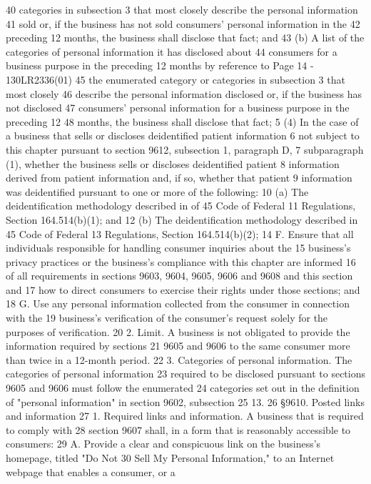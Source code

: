 40 categories in subsection 3 that most closely describe the personal information
41 sold or, if the business has not sold consumers' personal information in the
42 preceding 12 months, the business shall disclose that fact; and
43 (b) A list of the categories of personal information it has disclosed about
44 consumers for a business purpose in the preceding 12 months by reference to 
Page 14 - 130LR2336(01)
45 the enumerated category or categories in subsection 3 that most closely
46 describe the personal information disclosed or, if the business has not disclosed
47 consumers' personal information for a business purpose in the preceding 12
48 months, the business shall disclose that fact;
5 (4) In the case of a business that sells or discloses deidentified patient information
6 not subject to this chapter pursuant to section 9612, subsection 1, paragraph D,
7 subparagraph (1), whether the business sells or discloses deidentified patient
8 information derived from patient information and, if so, whether that patient
9 information was deidentified pursuant to one or more of the following:
10 (a) The deidentification methodology described in of 45 Code of Federal
11 Regulations, Section 164.514(b)(1); and
12 (b) The deidentification methodology described in 45 Code of Federal
13 Regulations, Section 164.514(b)(2);
14 F. Ensure that all individuals responsible for handling consumer inquiries about the
15 business's privacy practices or the business's compliance with this chapter are informed
16 of all requirements in sections 9603, 9604, 9605, 9606 and 9608 and this section and
17 how to direct consumers to exercise their rights under those sections; and
18 G. Use any personal information collected from the consumer in connection with the
19 business's verification of the consumer's request solely for the purposes of verification.
20 2. Limit. A business is not obligated to provide the information required by sections
21 9605 and 9606 to the same consumer more than twice in a 12-month period.
22 3. Categories of personal information. The categories of personal information
23 required to be disclosed pursuant to sections 9605 and 9606 must follow the enumerated
24 categories set out in the definition of "personal information" in section 9602, subsection
25 13.
26 §9610. Posted links and information
27 1. Required links and information. A business that is required to comply with
28 section 9607 shall, in a form that is reasonably accessible to consumers:
29 A. Provide a clear and conspicuous link on the business's homepage, titled "Do Not
30 Sell My Personal Information," to an Internet webpage that enables a consumer, or a
